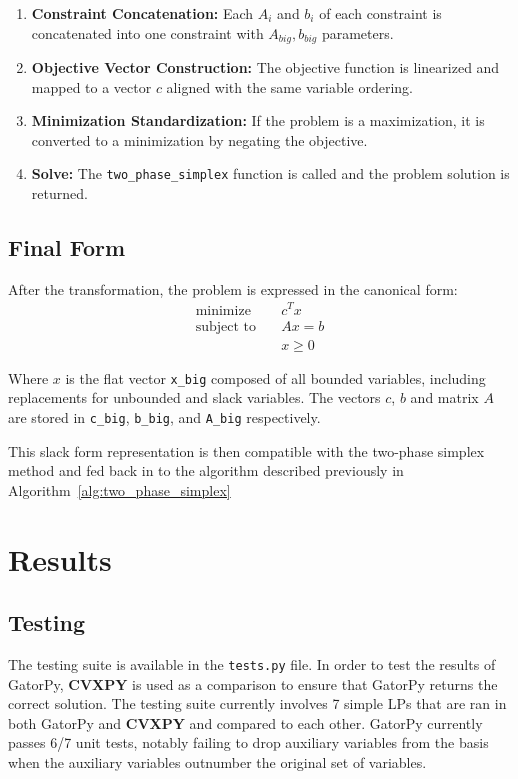 \documentclass[conference]{IEEEtran}
\begin{document}
\begin{enumerate}
    \item \textbf{Constraint Concatenation:} Each $A_i$ and $b_i$ of each constraint is concatenated into one constraint with $A_{big}, b_{big}$ parameters.
    
    \item \textbf{Objective Vector Construction:} The objective function is linearized and mapped to a vector $c$ aligned with the same variable ordering.
    
    \item \textbf{Minimization Standardization:} If the problem is a maximization, it is converted to a minimization by negating the objective.
    \item \textbf{Solve: } The \texttt{two\_phase\_simplex} function is called and the problem solution is returned.
\end{enumerate}

\subsection{Final Form}

After the transformation, the problem is expressed in the canonical form:
\begin{align*}
\text{minimize} \quad & c^T x \\
\text{subject to} \quad & Ax = b \\
& x \geq 0
\end{align*}

Where $x$ is the flat vector \texttt{x\_big} composed of all bounded variables, including replacements for unbounded and slack variables. 
The vectors $c$, $b$ and matrix $A$ are stored in \texttt{c\_big}, \texttt{b\_big}, and \texttt{A\_big} respectively.

This slack form representation is then compatible with the two-phase simplex method and fed back in to the algorithm described previously in Algorithm~\ref{alg:two_phase_simplex}

\section{Results}
\label{sse:results}
\subsection{Testing}
The testing suite is available in the \texttt{tests.py} file.
In order to test the results of GatorPy, \textbf{CVXPY} is used as a comparison to ensure that GatorPy returns the correct solution.
The testing suite currently involves 7 simple LPs that are ran in both GatorPy and \textbf{CVXPY} and compared to each other.
GatorPy currently passes 6/7 unit tests, notably failing to drop auxiliary variables from the basis when the auxiliary variables outnumber the original set of variables.
\end{document}
